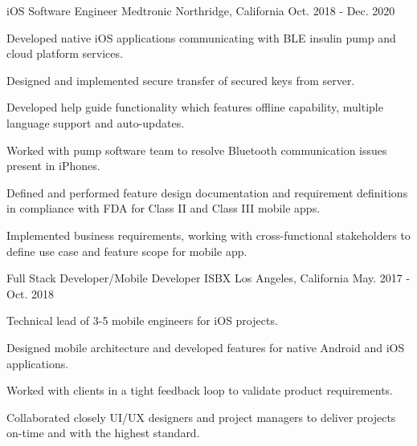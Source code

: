 \begin{cventries}
  \cventry
    {iOS Software Engineer} %
    {Medtronic} %
    {Northridge, California} %
    {Oct. 2018 - Dec. 2020} %
    {
      \begin{cvitems} %
        \item {Developed native iOS applications communicating with BLE insulin pump and cloud platform services.}
        \item {Designed and implemented secure transfer of secured keys from server.}
        \item {Developed help guide functionality which features offline capability, multiple language support and auto-updates.}
        \item {Worked with pump software team to resolve Bluetooth communication issues present in iPhones.}
        \item {Defined and performed feature design documentation and requirement definitions in compliance with FDA for Class II and Class III mobile apps.}
        \item {Implemented business requirements, working with cross-functional stakeholders to define use case and feature scope for mobile app.}
      \end{cvitems}
    }

  \cventry
    {Full Stack Developer/Mobile Developer} %
    {ISBX} %
    {Los Angeles, California} %
    {May. 2017 - Oct. 2018} %
    {
      \begin{cvitems} %
        \item {Technical lead of 3-5 mobile engineers for iOS projects.}
        \item {Designed mobile architecture and developed features for native Android and iOS applications.}
        \item {Worked with clients in a tight feedback loop to validate product requirements.}
        \item {Collaborated closely UI/UX designers and project managers to deliver projects on-time and with the highest standard.}
      \end{cvitems}
    }


\end{cventries}
